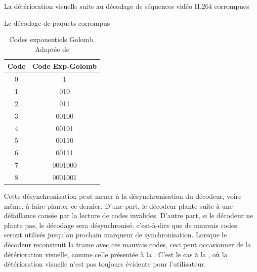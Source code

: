 \begin{chapter}{La détérioration visuelle suite au décodage de séquences vidéo H.264 corrompues}
\begin{section}{Le décodage de paquets corrompus}
\begin{table}
	\caption[Codes exponentiels Golomb]{Codes exponentiels Golomb. \\Adaptée de
\citet[p.~11]{Ikuno2007}}
	\vspace{-1em}
	\label{tab-ExpGolomb}
	\centering
  	\begin{tabular}{| c | c | }
    	\hline
    	\textbf{Code} & \textbf{Code Exp-Golomb}\\
    	\hline
    	0 & 1\\ \hline
    	1 & 010\\ \hline
    	2 & 011\\ \hline
    	3 & 00100\\ \hline
    	4 & 00101\\ \hline
    	5 & 00110\\ \hline
    	6 & 00111\\ \hline
    	7 & 0001000\\ \hline
    	8 & 0001001\\ \hline
  \end{tabular}
\end{table}


Cette désynchronisation peut mener à la désynchronisation du décodeur, voire
même, à faire planter ce dernier. D'une part, le décodeur plante suite à une
défaillance causée par la lecture de codes invalides. D'autre part, si le
décodeur ne plante pas, le décodage sera désynchronisé, c'est-à-dire que de
mauvais codes seront utilisés jusqu'au prochain marqueur de synchronisation.
Lorsque le décodeur reconstruit la trame avec ces mauvais codes, ceci peut
occasionner de la détérioration visuelle, comme celle présentée à la
. C'est le cas à la , où la détérioration
visuelle n'est pas toujours évidente pour l'utilisateur.


\end{section}
\end{chapter}
